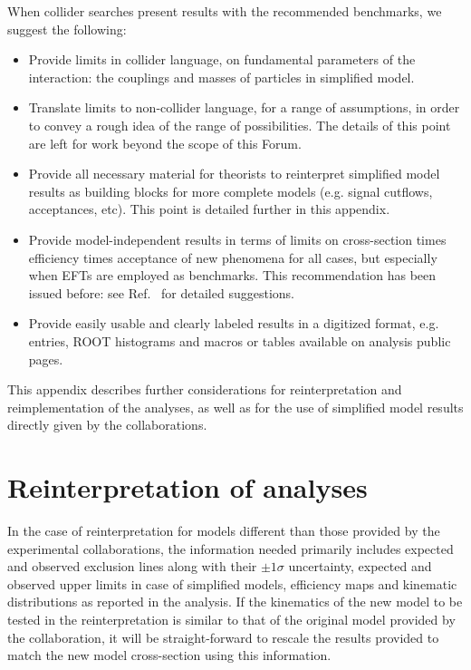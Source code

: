  When collider searches present results with the recommended benchmarks, we suggest the following:
 \begin{itemize}
 \item Provide limits in collider language, on fundamental parameters of
 the interaction: the couplings and masses of particles in simplified model.
 \item Translate limits to non-collider language, for a range of
 assumptions, in order to convey a rough idea of the range of
 possibilities. The details of this point are left for work beyond the scope of this Forum. 
 \item Provide all necessary material for theorists to reinterpret simplified
 model results as building blocks for more complete models (e.g. signal cutflows,
 acceptances, etc). This point is detailed further in this appendix.
\item Provide model-independent results in terms of limits on
  cross-section times efficiency times acceptance of new phenomena for all cases, but
  especially when EFTs are employed as benchmarks. This recommendation has been issued before: see
  Ref.~\cite{Kraml:2012sg} for detailed suggestions.
 \item Provide easily usable and clearly labeled results in a digitized format, e.g.~\cite{HEPData} entries, ROOT histograms and macros
 or tables available on analysis public pages.
 \end{itemize}

This appendix describes further considerations for reinterpretation and reimplementation of the analyses, 
as well as for the use of simplified model results directly given by the collaborations. 

\section{Reinterpretation of analyses}

In the case of reinterpretation for models different than those provided by the experimental collaborations,
the information needed primarily includes expected and observed exclusion lines along with their $\pm 1 \sigma$ uncertainty, 
expected and observed upper limits in case of simplified models, efficiency maps and kinematic distributions
as reported in the analysis. If the kinematics of the new model to be tested in the reinterpretation is similar to that 
of the original model provided by the collaboration, it
will be straight-forward to rescale the results provided to match the new model cross-section
using this information. 

